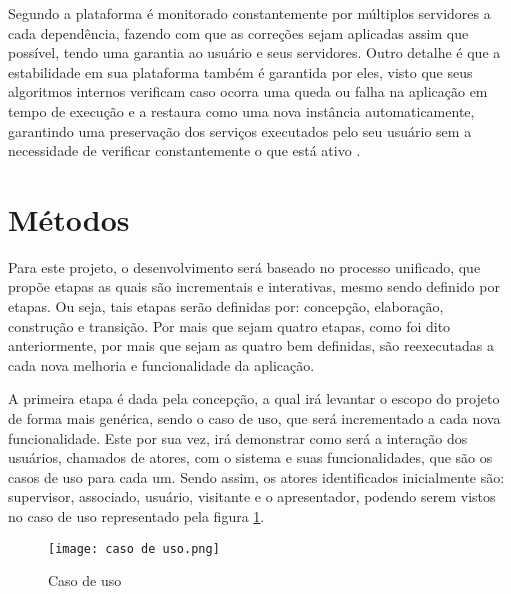 Segundo a plataforma é monitorado constantemente por múltiplos servidores a cada dependência, fazendo com que as correções sejam aplicadas assim que possível, tendo uma garantia ao usuário e seus servidores.  Outro detalhe é que a estabilidade em sua plataforma também é garantida por eles, visto que seus algoritmos internos verificam caso ocorra uma queda ou falha na aplicação em tempo de execução e a restaura como uma nova instância automaticamente, garantindo uma preservação dos serviços executados pelo seu usuário sem a necessidade de verificar constantemente o que está ativo \cite{HEROKU}.

\section{Métodos}
Para este projeto, o desenvolvimento será baseado no processo unificado, que propõe etapas as quais são incrementais e interativas, mesmo sendo definido por etapas. Ou seja, tais etapas serão definidas por: concepção, elaboração, construção e transição. Por mais que sejam quatro etapas, como foi dito anteriormente, por mais que sejam as quatro bem definidas, são reexecutadas a cada nova melhoria e funcionalidade da aplicação.

A primeira etapa é dada pela concepção, a qual irá levantar o escopo do projeto de forma mais genérica, sendo o caso de uso, que será incrementado a cada nova funcionalidade. Este por sua vez, irá demonstrar como será a interação dos usuários, chamados de atores, com o sistema e suas funcionalidades, que são os casos de uso para cada um. Sendo assim, os atores identificados inicialmente são: supervisor, associado, usuário, visitante e o apresentador, podendo serem vistos no caso de uso representado pela figura \ref{fig_caso_uso}.

\begin{figure}[H]
    \caption{\label{fig_caso_uso}Caso de uso}
    \vspace{5pt}
    \centering
    \texttt{[image: caso de uso.png]}
    \vspace{5pt}
\end{figure}

